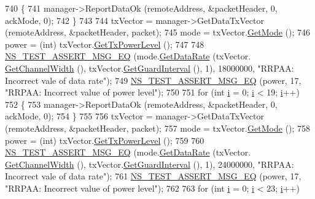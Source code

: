 \begin{DoxyCode}
740     \{
741       manager->ReportDataOk (remoteAddress, &packetHeader, 0, ackMode, 0);
742     \}
743 
744   txVector = manager->GetDataTxVector (remoteAddress, &packetHeader, packet);
745   mode = txVector.\hyperlink{classns3_1_1WifiTxVector_a497b1f11cad4b8b26251dfa07c9ad1d6}{GetMode} ();
746   power = (int) txVector.\hyperlink{classns3_1_1WifiTxVector_a7c98bd9609ff1c5cefa6e22d6908a2fe}{GetTxPowerLevel} ();
747 
748   \hyperlink{group__testing_ga2a9d78cffb3db8e867c35fff0b698cf5}{NS\_TEST\_ASSERT\_MSG\_EQ} (mode.\hyperlink{classns3_1_1WifiMode_adcfbe150f69da720db23387f733b8a52}{GetDataRate} (txVector.
      \hyperlink{classns3_1_1WifiTxVector_a1f8bfa51778a3e217581eb665f059564}{GetChannelWidth} (), txVector.\hyperlink{classns3_1_1WifiTxVector_ab80c0fd812542ef337a6cace4f64db63}{GetGuardInterval} (), 1), 18000000, \textcolor{stringliteral}{"RRPAA:
       Incorrect vale of data rate"});
749   \hyperlink{group__testing_ga2a9d78cffb3db8e867c35fff0b698cf5}{NS\_TEST\_ASSERT\_MSG\_EQ} (power, 17, \textcolor{stringliteral}{"RRPAA: Incorrect value of power level"});
750 
751   \textcolor{keywordflow}{for} (\textcolor{keywordtype}{int} \hyperlink{bernuolliDistribution_8m_a6f6ccfcf58b31cb6412107d9d5281426}{i} = 0; \hyperlink{bernuolliDistribution_8m_a6f6ccfcf58b31cb6412107d9d5281426}{i} < 19; \hyperlink{bernuolliDistribution_8m_a6f6ccfcf58b31cb6412107d9d5281426}{i}++)
752     \{
753       manager->ReportDataOk (remoteAddress, &packetHeader, 0, ackMode, 0);
754     \}
755 
756   txVector = manager->GetDataTxVector (remoteAddress, &packetHeader, packet);
757   mode = txVector.\hyperlink{classns3_1_1WifiTxVector_a497b1f11cad4b8b26251dfa07c9ad1d6}{GetMode} ();
758   power = (int) txVector.\hyperlink{classns3_1_1WifiTxVector_a7c98bd9609ff1c5cefa6e22d6908a2fe}{GetTxPowerLevel} ();
759 
760   \hyperlink{group__testing_ga2a9d78cffb3db8e867c35fff0b698cf5}{NS\_TEST\_ASSERT\_MSG\_EQ} (mode.\hyperlink{classns3_1_1WifiMode_adcfbe150f69da720db23387f733b8a52}{GetDataRate} (txVector.
      \hyperlink{classns3_1_1WifiTxVector_a1f8bfa51778a3e217581eb665f059564}{GetChannelWidth} (), txVector.\hyperlink{classns3_1_1WifiTxVector_ab80c0fd812542ef337a6cace4f64db63}{GetGuardInterval} (), 1), 24000000, \textcolor{stringliteral}{"RRPAA:
       Incorrect vale of data rate"});
761   \hyperlink{group__testing_ga2a9d78cffb3db8e867c35fff0b698cf5}{NS\_TEST\_ASSERT\_MSG\_EQ} (power, 17, \textcolor{stringliteral}{"RRPAA: Incorrect value of power level"});
762 
763   \textcolor{keywordflow}{for} (\textcolor{keywordtype}{int} \hyperlink{bernuolliDistribution_8m_a6f6ccfcf58b31cb6412107d9d5281426}{i} = 0; \hyperlink{bernuolliDistribution_8m_a6f6ccfcf58b31cb6412107d9d5281426}{i} < 23; \hyperlink{bernuolliDistribution_8m_a6f6ccfcf58b31cb6412107d9d5281426}{i}++)

\end{DoxyCode}
